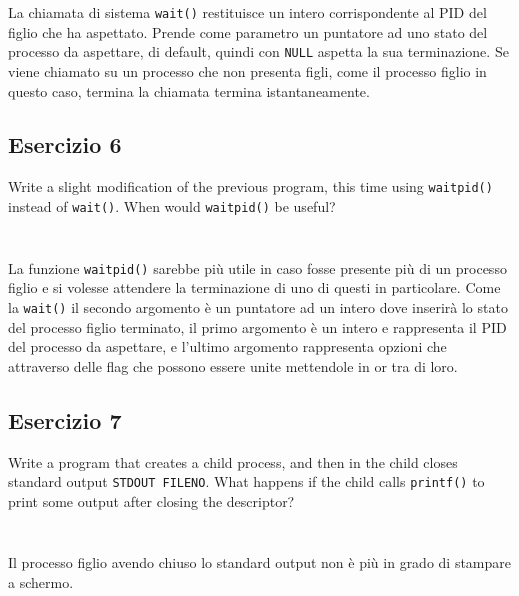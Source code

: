 \documentclass{article}
\numberwithin{equation}{subsection}
\begin{document}
\inputminted[firstline=1, lastline=4]{c}{./"Esercitazione del 29-10-24"/domanda5.c}
\inputminted[firstline=11, lastline=19]{c}{./"Esercitazione del 29-10-24"/domanda5.c}

La chiamata di sistema \verb|wait()| restituisce un intero corrispondente al PID del figlio 
che ha aspettato. Prende come parametro un puntatore ad uno stato del processo da aspettare, 
di default, quindi con \verb|NULL| aspetta la sua terminazione. Se viene chiamato su un 
processo che non presenta figli, come il processo figlio in questo caso, termina la chiamata termina istantaneamente. 

\subsection{Esercizio 6}

Write a slight modification of the previous program, this time using \verb|waitpid()| instead of \verb|wait()|. 
When would \verb|waitpid()| be useful?

\inputminted[firstline=1, lastline=4]{c}{./"Esercitazione del 29-10-24"/domanda6.c}
\inputminted[firstline=10, lastline=19]{c}{./"Esercitazione del 29-10-24"/domanda6.c}

La funzione \verb|waitpid()| sarebbe più utile in caso fosse presente più di un processo figlio 
e si volesse attendere la terminazione di uno di questi in particolare. Come 
la \verb|wait()| il secondo argomento è un puntatore ad un intero dove inserirà lo 
stato del processo figlio terminato, il primo argomento è un intero e rappresenta il 
PID del processo da aspettare, e l'ultimo argomento rappresenta opzioni che attraverso 
delle flag che possono essere unite mettendole in or tra di loro. 

\subsection{Esercizio 7}

Write a program that creates a child process, and then in the child closes standard output \verb|STDOUT FILENO|. 
What happens if the child calls \verb|printf()| to print some output after closing the descriptor?


\inputminted[firstline=1, lastline=4]{c}{./"Esercitazione del 29-10-24"/domanda7.c}
\inputminted[firstline=11, lastline=17]{c}{./"Esercitazione del 29-10-24"/domanda7.c}

Il processo figlio avendo chiuso lo standard output non è più in grado di stampare a schermo. 
\end{document}
